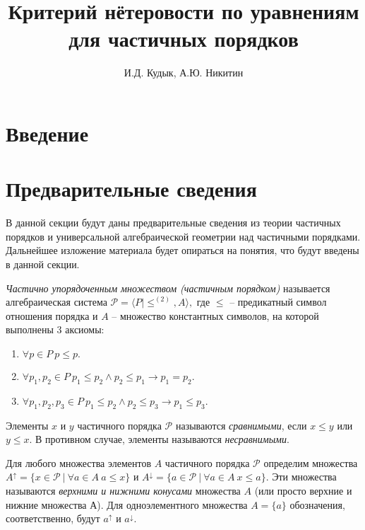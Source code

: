 \documentclass[12pt]{article}
\title{Критерий нётеровости по уравнениям для частичных порядков}
\author{И.Д. Кудык, А.Ю. Никитин}
\theoremstyle{break}
\def\P{\mathcal{P}}
\begin{document}
    \maketitle %
    \thispagestyle{empty} %
    \tableofcontents %
    \newpage
    
    \section{Введение} %

	\section{Предварительные сведения}
		В данной секции будут даны предварительные сведения из теории частичных порядков и универсальной алгебраической геометрии над частичными порядками. Дальнейшее изложение материала будет опираться на понятия, что будут введены в данной секции.
			
		\textit{Частично упорядоченным множеством (частичным порядком)} называется алгебраическая система $\P = \langle P | \leqslant^{(2)}, A\rangle,$ где $\leqslant$ -- предикатный символ отношения порядка и $A$ -- множество константных символов, на которой выполнены 3 аксиомы:
		\begin{enumerate}
			\item $\forall p\in P\ p\leqslant p.$
			\item $\forall p_1, p_2\in P\ p_1 \leqslant p_2 \wedge p_2 \leqslant p_1 \rightarrow p_1=p_2.$
			\item $\forall p_1, p_2, p_3\in P\ p_1 \leqslant p_2 \wedge p_2 \leqslant p_3 \rightarrow p_1 \leqslant p_3.$
		\end{enumerate}
		
		Элементы $x$ и $y$ частичного порядка $\P$ называются \textit{сравнимыми}, если $x\leqslant y$ или $y\leqslant x.$ В противном случае, элементы называются \textit{несравнимыми}.
	
		Для любого множества элементов $A$ частичного порядка $\P$ определим множества $A^{\uparrow} = \{ x\in\P\ |\ \forall a\in A\ a\leqslant x\}$ и $A^{\downarrow} = \{ a\in\P\ |\ \forall a\in A\ x\leqslant a\}$. Эти множества называются \textit{верхними и нижними конусами} множества $A$ (или просто верхние и нижние множества А). Для одноэлементного множества $A=\{a\}$ обозначения, соответственно, будут $a^{\uparrow}$ и $a^{\downarrow}.$
\end{document}
